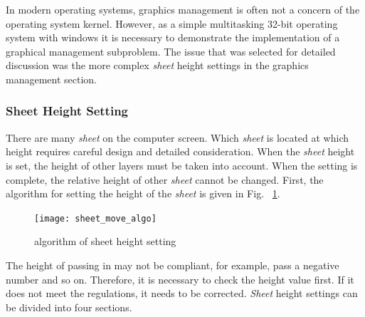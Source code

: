 \documentclass{swfcthesis}
\begin{document}
In modern operating systems, graphics management is often not a concern of the operating
system kernel. However, as a simple multitasking 32-bit operating system with windows it
is necessary to demonstrate the implementation of a graphical management subproblem. The
issue that was selected for detailed discussion was the more complex \emph{sheet} height
settings in the graphics management section.

\subsubsection{Sheet Height Setting}
\label{sec:sheet-height-setting}

There are many \emph{sheet} on the computer screen. Which \emph{sheet} is located at which
height requires careful design and detailed consideration. When the \emph{sheet} height is set,
the height of other layers must be taken into account. When the setting is complete, the
relative height of other \emph{sheet} cannot be changed. First, the algorithm for setting
the height of the \emph{sheet} is given in Fig. ~\ref{fig:sheet-heht}.
\begin{figure}[!ht]
  \centering
  \texttt{[image: sheet\_move\_algo]} 
  \caption{algorithm of sheet height setting}
  \label{fig:sheet-heht}
\end{figure}

The height of passing in may not be compliant, for example, pass a negative number and so
on. Therefore, it is necessary to check the height value first. If it does not meet the
regulations, it needs to be corrected. \emph{Sheet} height settings can be divided into
four sections.
\end{document}
